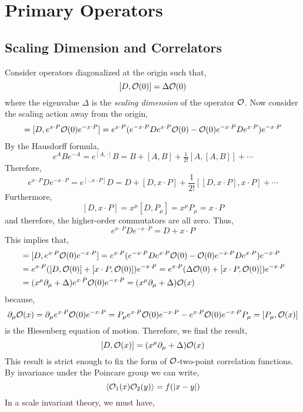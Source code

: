 \documentclass[12pt]{extarticle}
\begin{document}
\section{Primary Operators}

\subsection{Scaling Dimension and Correlators}

Consider operators diagonalized at the origin such that,
\[ [D, \mathcal{O}(0)] = \Delta \mathcal{O}(0) \]
where the eigenvalue $\Delta$ is the \textit{scaling dimension} of the operator $\mathcal{O}$. Now consider the scaling action away from the origin,
\begin{align*}
[D, \Op(x)] = [D, e^{x \cdot P} \Op(0) e^{-x \cdot P}] = e^{x \cdot P} (e^{-x \cdot P} D e^{x \cdot P} \Op(0) - \Op(0) e^{-x \cdot P} D e^{x \cdot P}) e^{- x \cdot P}
\end{align*}
By the Hausdorff formula,
\[ e^{A} B e^{-A} = e^{[A, \cdot]} B = B + [A, B] + \tfrac{1}{2!} [A, [A, B]] + \cdots \] 
Therefore,
\[ e^{x \cdot P} D e^{-x \cdot P} = e^{[\cdot, x \cdot P]} D = D + [D, x \cdot P] + \frac{1}{2!} [[D, x \cdot P], x \cdot P] + \cdots  \]
Furthermore,
\[ [D, x \cdot P] = x^\mu [D, P_\mu] = x^\mu P_\mu = x \cdot P \]
and therefore, the higher-order commutators are all zero. Thus,
\[ e^{x \cdot P} D e^{-x \cdot P} = D + x \cdot P \]
This implies that,
\begin{align*}
[D, \Op(x)] & = [D, e^{x \cdot P} \Op(0)e^{-x \cdot P}] = e^{x \cdot P} (e^{-x \cdot P} D e^{x \cdot P} \Op(0) - \Op(0) e^{-x \cdot P} D e^{x \cdot P} ) e^{-x \cdot P} 
\\
& =  e^{x \cdot P} ([D, \Op(0)] + [x \cdot P, \Op(0)]) e^{-x \cdot P} = e^{x \cdot P} (\Delta \Op(0) + [x \cdot P, \Op(0)] ) e^{-x \cdot P}
\\
& = (x^\mu \partial_\mu + \Delta) e^{x \cdot P} \Op(0) e^{-x \cdot P} = (x^\mu \partial_\mu + \Delta) \Op(x)
\end{align*}
because,
\[ \partial_\mu \mathcal{O}(x) = \partial_\mu e^{x \cdot P} \mathcal{O}(0) e^{-x \cdot P} = P_\mu e^{x \cdot P} \mathcal{O}(0) e^{-x \cdot P} - e^{x \cdot P} \mathcal{O}(0) e^{-x \cdot P} P_\mu = [P_\mu, \mathcal{O}(x)] \]
is the Hiesenberg equation of motion. 
Therefore, we find the result,
\[ [D, \mathcal{O}(x)] = (x^\mu \partial_\mu + \Delta) \mathcal{O}(x) \]
This result is strict enough to fix the form of $\mathcal{O}$-two-point correlation functions. By invariance under the Poincare group we can write,
\[ \left< \mathcal{O}_1(x) \mathcal{O}_2(y) \right> = f(|x - y|) \]
In a scale invariant theory, we must have,
\end{document}
